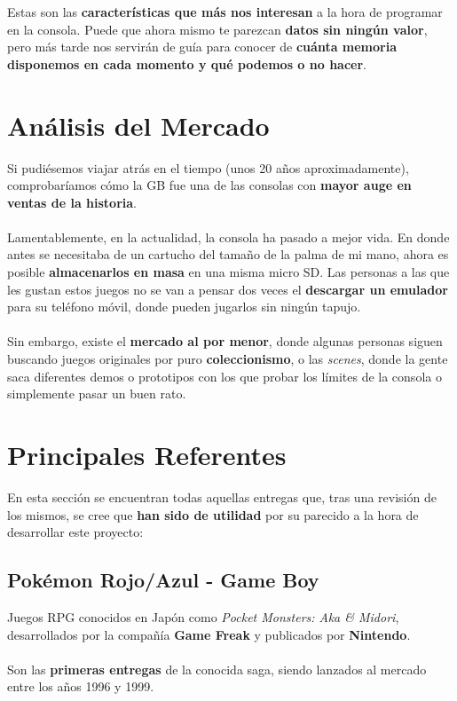 Estas son las \textbf{características que más nos interesan} a la hora de programar en la consola. Puede que ahora mismo te parezcan \textbf{datos sin ningún valor}, pero más tarde nos servirán de guía para conocer de \textbf{cuánta memoria disponemos en cada momento y qué podemos o no hacer}.

\clearpage

\section{Análisis del Mercado}

Si pudiésemos viajar atrás en el tiempo (unos 20 años aproximadamente), comprobaríamos cómo la GB fue una de las consolas con \textbf{mayor auge en ventas de la historia}.
\\ \\
Lamentablemente, en la actualidad, la consola ha pasado a mejor vida. En donde antes se necesitaba de un cartucho del tamaño de la palma de mi mano, ahora es posible \textbf{almacenarlos en masa} en una misma micro SD. Las personas a las que les gustan estos juegos no se van a pensar dos veces el \textbf{descargar un emulador} para su teléfono móvil, donde pueden jugarlos sin ningún tapujo.
\\ \\
Sin embargo, existe el \textbf{mercado al por menor}, donde algunas personas siguen buscando juegos originales por puro \textbf{coleccionismo}, o las \textit{scenes}, donde la gente saca diferentes demos o prototipos con los que probar los límites de la consola o simplemente pasar un buen rato.

\section{Principales Referentes}

En esta sección se encuentran todas aquellas entregas que, tras una revisión de los mismos, se cree que \textbf{han sido de utilidad} por su parecido a la hora de desarrollar este proyecto:

\subsection{Pokémon Rojo/Azul - Game Boy}

Juegos RPG conocidos en Japón como \textit{Pocket Monsters: Aka \& Midori}, desarrollados por la compañía \textbf{Game Freak} y publicados por \textbf{Nintendo}.
\\ \\
Son las \textbf{primeras entregas} de la conocida saga, siendo lanzados al mercado entre los años 1996 y 1999.


